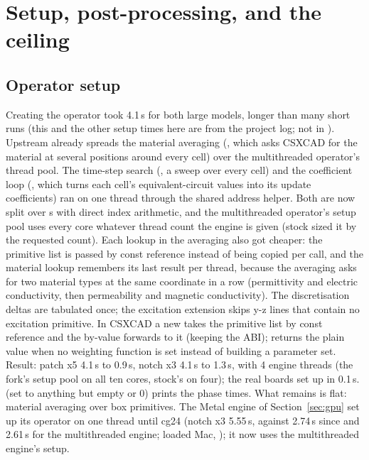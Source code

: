 \section{Setup, post-processing, and the ceiling}\label{sec:beyond}

\subsection{Operator setup}
Creating the operator took 4.1\,s for both large models, longer than many short runs (this and the other setup times
here are from the project log; not in ). Upstream already spreads the material averaging
(, which asks CSXCAD for the material at several positions around every cell) over the multithreaded
operator's thread pool. The time-step search (, a sweep over every cell) and the coefficient
loop (, which turns each cell's equivalent-circuit values into its update coefficients) ran
on one thread through the shared address helper. Both are now split over s with direct index
arithmetic, and the multithreaded operator's setup pool uses every core whatever thread count the engine is given
(stock sized it by the requested count). Each lookup in the averaging also got cheaper: the primitive list is passed by
const reference instead of being copied per call, and the material lookup remembers its last result per thread,
because the averaging asks for two material types at the same coordinate in a row (permittivity and electric
conductivity, then permeability and magnetic conductivity). The discretisation deltas are tabulated once; the
excitation extension skips y-z lines that contain no excitation primitive. In CSXCAD a new
 takes the primitive list by const reference and the by-value
 forwards to it (keeping the ABI);  returns the plain
value when no weighting function is set instead of building a parameter set. Result: patch x5 4.1\,s to 0.9\,s, notch
x3 4.1\,s to 1.3\,s, with 4 engine threads (the fork's setup pool on all ten cores, stock's on four); the real boards
set up in 0.1\,s.  (set to anything but empty or 0) prints the phase times. What remains
is flat: material averaging over box primitives. The Metal engine of Section~\ref{sec:gpu} set up its operator on one
thread until cg24 (notch x3 5.55\,s, against 2.74\,s since and 2.61\,s for the multithreaded engine; loaded Mac,
); it now uses the multithreaded engine's setup.

